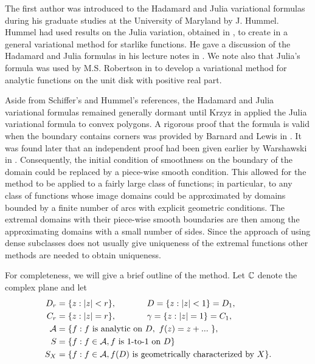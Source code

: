 \documentclass[final]{siamltex}
\begin{document}
The first author was introduced to the Hadamard and Julia variational formulas during his graduate studies 
at the University of Maryland by J. Hummel.  Hummel had used results on the Julia variation, obtained in
\cite{SchSchSp1}, to create in \cite{Hummel1} a general variational method for starlike functions.  He gave a
discussion of the Hadamard and Julia formulas in his lecture notes in \cite{Hummel2}.  We note also that 
Julia's formula was used by M.S. Robertson in \cite{Robertson1} to develop a variational method for analytic
functions on the unit disk with positive real part.


Aside from Schiffer's and Hummel's references, the Hadamard and Julia variational formulas remained generally 
dormant until Krzyz in \cite{Krzyz1} 
applied the Julia variational formula to convex polygons.  A rigorous proof that the formula is valid when 
the boundary contains corners was provided by Barnard and Lewis in \cite{BarnardLewis1}.  It was found later that an 
independent proof had been given earlier by Warshawski in \cite{Warshawski1}.  Consequently, the initial condition
of smoothness on the boundary of the domain could be replaced by a piece-wise smooth condition.  This allowed 
for the method to be applied to a fairly large class of functions; in particular, to any class of functions whose 
image domains could be approximated by domains bounded by a finite number of arcs with explicit geometric conditions.
The extremal domains with their piece-wise smooth boundaries are then among the approximating domains with a small
number of sides. Since the approach of using dense subclasses does not usually give uniqueness of the extremal 
functions other methods are needed to obtain uniqueness.

For completeness, we will give a brief outline of the method.  Let $\Bbb  C$ denote the complex plane and let
\begin{align*}
D_r &= \{ z : |z| < r \}, \hspace{0.5in}D = \{ z : |z| < 1 \} = D_1, \\
C_r &= \{ z : |z| = r \}, \hspace{0.5in}\gamma = \{ z : |z| = 1 \} = C_1, \\
{\cal A} &= \{ f : f \mbox{ is analytic on } D, \ f(z) = z + . . . \ \}, \\
S &= \{ f : f \in {\cal A}, f \mbox{ is 1-to-1 on } D \} \\
S_X &= \{ f : f \in {\cal A}, f(D) \mbox{ is geometrically characterized by } X \}.
\end{align*} 
\end{document}
